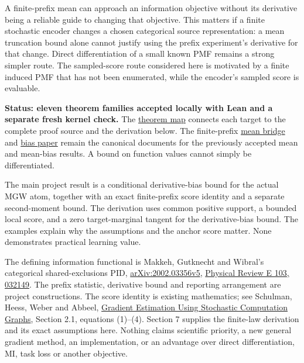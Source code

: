 \documentclass[11pt,a4paper]{article}
\title{\PidReportTitle{Finite-prefix MGW derivatives: a score identity, truncation bound and second moment}{Finite categorical laws, complete derivations and explicit proof scope}}
\author{Sepehr Mahmoudian}
\date{}
\begin{document}
\PidMakeTitle
A finite-prefix mean can approach an information objective without its derivative being a reliable guide to changing that objective. This matters if a finite stochastic encoder changes a chosen categorical source representation: a mean truncation bound alone cannot justify using the prefix experiment's derivative for that change. Direct differentiation of a small known PMF remains a strong simpler route. The sampled-score route considered here is motivated by a finite induced PMF that has not been enumerated, while the encoder's sampled score is evaluable.

\textbf{Status: eleven theorem families accepted locally with Lean and a separate fresh kernel check.} The \href{https://github.com/sepahead/pid-rs/blob/main/audit/formal/lean-prefix-mgw-gradient/THEOREM_MAP.md}{theorem map} connects each target to the complete proof source and the derivation below. The finite-prefix \href{https://github.com/sepahead/pid-rs/blob/main/audit/formal/lean-prefix-mgw-mean/EXPOSITION.current.md}{mean bridge} and \href{https://github.com/sepahead/pid-rs/blob/main/audit/formal/lean-prefix-mgw-bias/EXPOSITION.md}{bias paper} remain the canonical documents for the previously accepted mean and mean-bias results. A bound on function values cannot simply be differentiated.

The main project result is a conditional derivative-bias bound for the actual MGW atom, together with an exact finite-prefix score identity and a separate second-moment bound. The derivation uses common positive support, a bounded local score, and a zero target-marginal tangent for the derivative-bias bound. The examples explain why the assumptions and the anchor score matter. None demonstrates practical learning value.

The defining information functional is Makkeh, Gutknecht and Wibral's categorical shared-exclusions PID, \href{https://arxiv.org/abs/2002.03356v5}{arXiv:2002.03356v5}, \href{https://doi.org/10.1103/PhysRevE.103.032149}{Physical Review E 103, 032149}. The prefix statistic, derivative bound and reporting arrangement are project constructions. The score identity is existing mathematics; see Schulman, Heess, Weber and Abbeel, \href{https://proceedings.neurips.cc/paper/2015/file/de03beffeed9da5f3639a621bcab5dd4-Paper.pdf}{Gradient Estimation Using Stochastic Computation Graphs}, Section 2.1, equations (1)--(4). Section 7 supplies the finite-law derivation and its exact assumptions here. Nothing claims scientific priority, a new general gradient method, an implementation, or an advantage over direct differentiation, MI, task loss or another objective.
\end{document}
